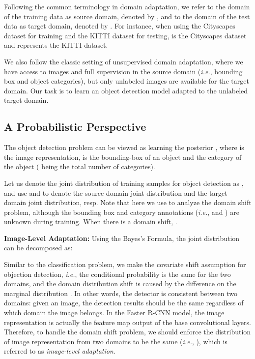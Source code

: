 \documentclass[10pt,twocolumn,letterpaper]{article}
\def\ie{\emph{i.e.}}
\begin{document}
Following the common terminology in domain adaptation, we refer to the domain of the training data as source domain, denoted by , and to the domain of the test data as target domain, denoted by . For instance, when using the Cityscapes dataset for training and the KITTI dataset for testing,  is the Cityscapes dataset and  represents the KITTI dataset. 

We also follow the classic setting of unsupervised domain adaptation, where we have access to images and full supervision in the source domain (\ie, bounding box and object categories), but only unlabeled images are available for the target domain. Our task is to learn an object detection model adapted to the unlabeled target domain.

\subsection{A Probabilistic Perspective}
\label{sec:dadet_prob}
The object detection problem can be viewed as learning the posterior , where  is the image representation,   is the bounding-box of an object and  the category of the object ( being the total number of categories). 

Let us denote the joint distribution of training samples for object detection as , and use  and  to denote the source domain joint distribution and the target domain joint distribution, resp. Note that here we use  to analyze the domain shift problem, although the bounding box and category annotations (\ie,  and ) are unknown during training. When there is a domain shift, .

\textbf{Image-Level Adaptation: } Using the Bayes's Formula, the joint distribution can be decomposed as:

Similar to the classification problem, we make the covariate shift assumption for objection detection, \ie, the conditional probability  is the same for the two domains, and the domain distribution shift is caused by the difference on the marginal distribution . In other words, the detector is consistent between two domains: given an image, the detection results should be the same regardless of which domain the image belongs. In the Faster R-CNN model, the image representation  is actually the feature map output of the base convolutional layers. Therefore, to handle the domain shift problem, we should enforce the distribution of image representation from two domains to be the same (\ie,  ), which is referred to as \textit{image-level adaptation}. 
\end{document}
